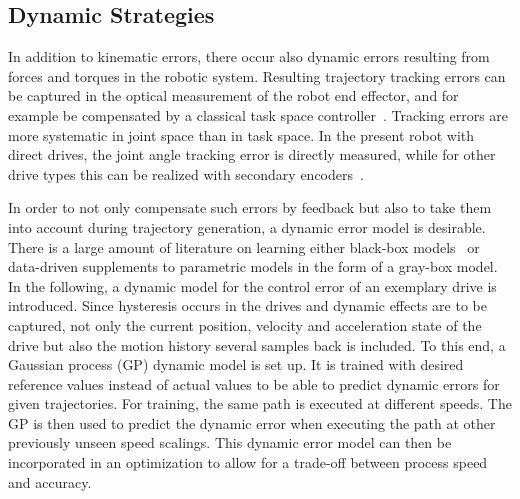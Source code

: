\documentclass[5p,times,procedia]{elsarticle}
\begin{document}
\subsection{Dynamic Strategies}\label{subsec:dynError}
In addition to kinematic errors, there occur also dynamic errors resulting from forces and torques in the robotic system.
Resulting trajectory tracking errors can be captured in the optical measurement of the robot end effector, and for example be compensated by a classical task space controller~\cite{Siciliano09}.
Tracking errors are more systematic in joint space than in task space.
In the present robot with direct drives, the joint angle tracking error is directly measured, while for other drive types this can be realized with secondary encoders~\cite{Mesmer22}.

In order to not only compensate such errors by feedback but also to take them into account during trajectory generation, a dynamic error model is desirable.
There is a large amount of literature on learning either black-box models~\cite{NguyenTuong08b} or data-driven supplements to parametric models in the form of a gray-box model.
In the following, a dynamic model for the control error of an exemplary drive is introduced.
Since hysteresis occurs in the drives and dynamic effects are to be captured, not only the current position, velocity and acceleration state of the drive but also the motion history several samples back is included. 
To this end, a Gaussian process (GP) dynamic model is set up.
It is trained with desired reference values instead of actual values to be able to predict dynamic errors for given trajectories.
For training, the same path is executed at different speeds. 
The GP is then used to predict the dynamic error when executing the path at other previously unseen speed scalings.
This dynamic error model can then be incorporated in an optimization to allow for a trade-off between process speed and accuracy.
%
\end{document}

